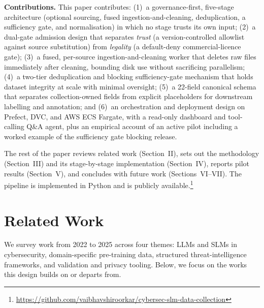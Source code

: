 \documentclass[conference]{IEEEtran}
\begin{document}
\textbf{Contributions.} This paper contributes: (1)~a
governance-first, five-stage architecture (optional sourcing, fused
ingestion-and-cleaning, deduplication, a sufficiency gate, and
normalisation) in which no stage trusts its own input; (2)~a dual-gate
admission design that separates \emph{trust} (a version-controlled
allowlist against source substitution) from \emph{legality} (a
default-deny commercial-licence gate); (3)~a fused, per-source
ingestion-and-cleaning worker that deletes raw files immediately after
cleaning, bounding disk use without sacrificing parallelism; (4)~a
two-tier deduplication and blocking sufficiency-gate mechanism that
holds dataset integrity at scale with minimal oversight; (5)~a 22-field
canonical schema that separates collection-owned fields from explicit
placeholders for downstream labelling and annotation; and (6)~an
orchestration and deployment design on Prefect, DVC, and AWS ECS
Fargate, with a read-only dashboard and tool-calling Q\&A agent, plus an
empirical account of an active pilot including a worked example of the
sufficiency gate blocking release.

The rest of the paper reviews related work (Section~II), sets out the
methodology (Section~III) and its stage-by-stage implementation
(Section~IV), reports pilot results (Section~V), and concludes with
future work (Sections~VI--VII). The pipeline is implemented in Python
and is publicly available.\footnote{\url{https://github.com/vaibhavshiroorkar/cybersec-slm-data-collection}}

\section{Related Work}

We survey work from 2022 to 2025 across four themes: LLMs and SLMs in
cybersecurity, domain-specific pre-training data, structured
threat-intelligence frameworks, and validation and privacy tooling.
Below, we focus on the works this design builds on or departs from.
\end{document}
